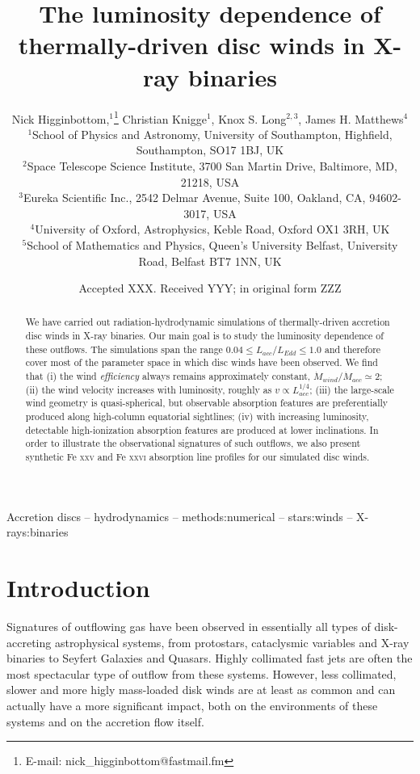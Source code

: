 \documentclass[a4paper,fleqn,usenatbib]{mnras}
\title[The luminosity dependence of disc winds in XRBs]{The luminosity dependence of thermally-driven disc winds in X-ray binaries}
\author[N. Higginbottom et. al]
{Nick Higginbottom,$^{1}$\thanks{E-mail: nick\_higginbottom@fastmail.fm}
Christian Knigge$^{1}$, Knox S. Long$^{2,3}$, 
James H. Matthews$^{4}$ \newauthor{and
Edward J. Parkinson$^{1}$.}
\\
$^{1}$School of Physics and Astronomy, University of Southampton, Highfield, Southampton, SO17 1BJ, UK\\
$^{2}$Space Telescope Science Institute, 3700 San Martin Drive, Baltimore, MD, 21218, USA\\
$^{3}$Eureka Scientific Inc., 2542 Delmar Avenue, Suite 100, Oakland, CA, 94602-3017, USA\\
$^{4}$University of Oxford, Astrophysics, Keble Road, Oxford OX1 3RH, UK\\
$^{5}$School of Mathematics and Physics, Queen's University Belfast, University Road, Belfast 
BT7 1NN, UK\\
}
\date{Accepted XXX. Received YYY; in original form ZZZ}
\begin{document}
\label{firstpage}
\pagerange{\pageref{firstpage}--\pageref{lastpage}}
\maketitle

\begin{abstract}

  We have carried out radiation-hydrodynamic simulations of
  thermally-driven accretion disc winds in X-ray binaries. Our main
  goal is to study the luminosity dependence of these outflows. The 
  simulations span the range 
  $0.04 \leq L_{acc}/L_{Edd} \leq 1.0$ and therefore cover most of the parameter
  space in which disc winds have been observed. We
  find that (i) the wind {\em
  efficiency} always remains approximately
  constant, $\dot{M}_{wind}/\dot{M}_{acc} \simeq
  2$; (ii) the wind velocity 
  increases with luminosity, roughly as $v \propto L_{acc}^{1/4}$;
  (iii) the large-scale wind geometry is quasi-spherical, but 
  observable absorption features are preferentially produced along
  high-column equatorial sightlines; (iv) with increasing luminosity,
  detectable high-ionization absorption features are produced at lower 
  inclinations. In order to illustrate the observational signatures of such
  outflows, we also present synthetic Fe \textsc{xxv}
  and Fe \textsc{xxvi} absorption line profiles for our simulated disc winds.


\end{abstract}

\begin{keywords}
Accretion discs -- hydrodynamics -- methods:numerical -- stars:winds -- X-rays:binaries
\end{keywords}



\section{Introduction}
Signatures of outflowing gas have been observed in essentially all
types of disk-accreting astrophysical systems, from protostars,
cataclysmic variables and X-ray binaries to Seyfert Galaxies and
Quasars. Highly collimated fast jets are often the most spectacular
type of outflow from these systems. However, less collimated, slower
and more higly mass-loaded disk winds are at least as common and can 
actually have a more significant impact, both on the environments of
these systems and on the accretion flow itself. 
 
\end{document}

